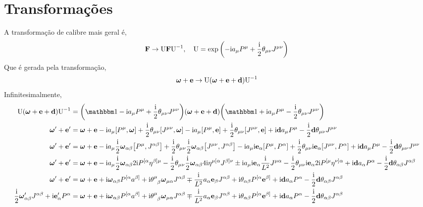 \section{Transformações}

A transformação de calibre mais geral é,
\[\vb F\rightarrow \textnormal U\vb F\textnormal U^{-1},\ \ \ \textnormal U=\exp\qty(-\textnormal{i} a_\mu P^\mu+\frac{\textnormal{i}}{2}\theta_{\mu\nu}J^{\mu\nu}) \]
Que é gerada pela transformação,
\[\boldsymbol \omega+\vb e\rightarrow \textnormal U\qty(\boldsymbol \omega+\vb e+\vb d)\textnormal U^{-1}\]
Infinitesimalmente,
\begin{align*}
    \textnormal U\qty(\boldsymbol \omega+\vb e+\vb d)\textnormal U^{-1}&=\qty(\mathbbm 1-\im a_\mu P^\mu+\frac\im2 \theta_{\mu\nu}J^{\mu\nu})\qty(\boldsymbol \omega+ \vb e+ \vb d)\qty(\mathbbm 1+\im a_\mu P^\mu-\frac\im2 \theta_{\mu\nu}J^{\mu\nu})\\
    \boldsymbol \omega'+\vb e'&=\boldsymbol \omega+\vb e -\im a_\mu \comm{P^\mu}{\boldsymbol\omega}+\frac\im 2\theta_{\mu\nu}\comm{J^{\mu\nu}}{\boldsymbol\omega}-\im a_\mu \comm{P^\mu}{\vb e}+\frac\im 2\theta_{\mu\nu}\comm{J^{\mu\nu}}{\vb e}+\im \vb da_\mu P^\mu-\frac\im 2\vb d\theta_{\mu\nu}J^{\mu\nu}\\
    \boldsymbol \omega'+\vb e'&=\boldsymbol \omega+\vb e -\im a_\mu \frac\im 2\boldsymbol\omega_{\alpha\beta} \comm{P^\mu}{J^{\alpha\beta}}+\frac\im 2\theta_{\mu\nu}\frac\im 2\boldsymbol\omega_{\alpha\beta}\comm{J^{\mu\nu}}{J^{\alpha\beta}}-\im a_\mu \im\vb e_\alpha\comm{P^\mu}{P^\alpha}+\frac\im 2\theta_{\mu\nu}\im \vb e_\alpha\comm{J^{\mu\nu}}{P^\alpha}+\im \vb da_\mu P^\mu-\frac\im 2\vb d \theta_{\mu\nu}J^{\mu\nu}\\
    \boldsymbol \omega'+\vb e'&=\boldsymbol \omega+\vb e -\im a_\mu \frac\im 2\boldsymbol\omega_{\alpha\beta}2\im P^{[\alpha}\eta^{\beta]\mu}-\frac\im 2\theta_{\mu\nu}\frac\im 2\boldsymbol\omega_{\alpha\beta}4\im\eta^{\mu[\alpha}J^{\beta]\nu}\pm\im a_\mu \im\vb e_\alpha\frac{\im}{L^2}J^{\mu\alpha}-\frac\im 2\theta_{\mu\nu}\im \vb e_\alpha2\im P^{[\mu}\eta^{\nu]\alpha}+\im \vb da_\alpha P^\alpha-\frac\im 2\vb d \theta_{\alpha\beta}J^{\alpha\beta}\\
    \boldsymbol \omega'+\vb e'&=\boldsymbol \omega+\vb e + \im \boldsymbol\omega_{\alpha\beta} P^{[\alpha}a^{\beta]}+\im\tensor{\theta}{^\mu_\beta}\boldsymbol\omega_{\mu\alpha}J^{\alpha\beta}\mp\frac{\im}{L^2} a_\alpha \vb e_\beta J^{\alpha\beta}+\im\theta_{\alpha\beta}  P^{[\alpha}\vb e^{\beta]}+\im \vb da_\alpha P^\alpha-\frac\im 2\vb d \theta_{\alpha\beta}J^{\alpha\beta}\\
    \frac\im 2\boldsymbol \omega_{\alpha\beta}'J^{\alpha\beta}+\im\vb e'_\alpha P^\alpha&=\boldsymbol \omega+\vb e + \im \boldsymbol\omega_{\alpha\beta} P^{[\alpha}a^{\beta]}+\im\tensor{\theta}{^\mu_\beta}\boldsymbol\omega_{\mu\alpha}J^{\alpha\beta}\mp\frac{\im}{L^2} a_\alpha \vb e_\beta J^{\alpha\beta}+\im\theta_{\alpha\beta}  P^{[\alpha}\vb e^{\beta]}+\im \vb da_\alpha P^\alpha-\frac\im 2\vb d \theta_{\alpha\beta}J^{\alpha\beta}
\end{align*}
